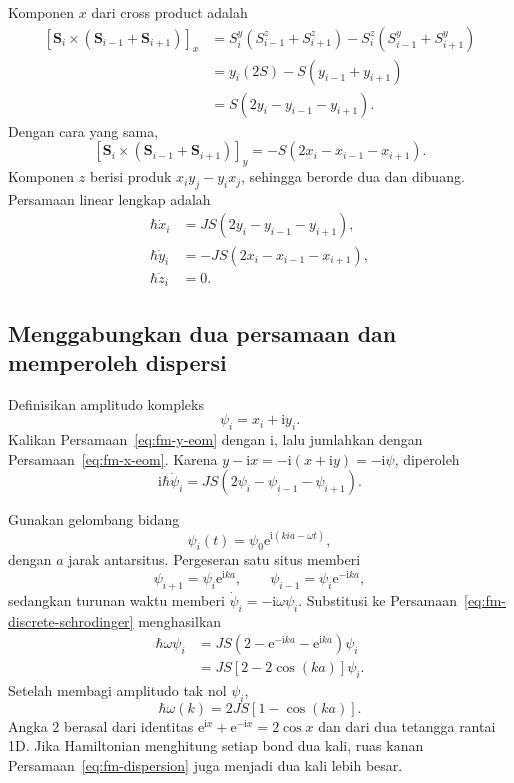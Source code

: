 \documentclass[11pt,a4paper]{article}
\newcommand{\ii}{\mathrm{i}}
\newcommand{\ee}{\mathrm{e}}
\newcommand{\vS}{\bm S}
\begin{document}
Komponen $x$ dari cross product adalah
\begin{align}
\left[\vS_i\times(\vS_{i-1}+\vS_{i+1})\right]_x
&=S_i^y(S_{i-1}^z+S_{i+1}^z)
-S_i^z(S_{i-1}^y+S_{i+1}^y)\\
&=y_i(2S)-S(y_{i-1}+y_{i+1})\\
&=S(2y_i-y_{i-1}-y_{i+1}).
\end{align}
Dengan cara yang sama,
\begin{equation}
\left[\vS_i\times(\vS_{i-1}+\vS_{i+1})\right]_y
=-S(2x_i-x_{i-1}-x_{i+1}).
\end{equation}
Komponen $z$ berisi produk $x_iy_j-y_ix_j$, sehingga berorde dua dan dibuang. Persamaan linear lengkap adalah
\begin{align}
\hbar\dot x_i&=JS(2y_i-y_{i-1}-y_{i+1}),\label{eq:fm-x-eom}\\
\hbar\dot y_i&=-JS(2x_i-x_{i-1}-x_{i+1}),\label{eq:fm-y-eom}\\
\hbar\dot z_i&=0.
\end{align}

\subsection{Menggabungkan dua persamaan dan memperoleh dispersi}

Definisikan amplitudo kompleks
\begin{equation}
\psi_i=x_i+\ii y_i.
\end{equation}
Kalikan Persamaan~\eqref{eq:fm-y-eom} dengan $\ii$, lalu jumlahkan dengan Persamaan~\eqref{eq:fm-x-eom}. Karena $y-\ii x=-\ii(x+\ii y)=-\ii\psi$, diperoleh
\begin{equation}
\ii\hbar\dot\psi_i
=JS(2\psi_i-\psi_{i-1}-\psi_{i+1}).
\label{eq:fm-discrete-schrodinger}
\end{equation}

Gunakan gelombang bidang
\begin{equation}
\psi_i(t)=\psi_0\ee^{\ii(kia-\omega t)},
\end{equation}
dengan $a$ jarak antarsitus. Pergeseran satu situs memberi
\begin{equation}
\psi_{i+1}=\psi_i\ee^{\ii ka},
\qquad
\psi_{i-1}=\psi_i\ee^{-\ii ka},
\end{equation}
sedangkan turunan waktu memberi $\dot\psi_i=-\ii\omega\psi_i$. Substitusi ke Persamaan~\eqref{eq:fm-discrete-schrodinger} menghasilkan
\begin{align}
\hbar\omega\psi_i
&=JS\left(2-\ee^{-\ii ka}-\ee^{\ii ka}\right)\psi_i\\
&=JS[2-2\cos(ka)]\psi_i.
\end{align}
Setelah membagi amplitudo tak nol $\psi_i$,
\begin{equation}
\boxed{\hbar\omega(k)=2JS[1-\cos(ka)].}
\label{eq:fm-dispersion}
\end{equation}
Angka $2$ berasal dari identitas $\ee^{\ii x}+\ee^{-\ii x}=2\cos x$ dan dari dua tetangga rantai 1D. Jika Hamiltonian menghitung setiap bond dua kali, ruas kanan Persamaan~\eqref{eq:fm-dispersion} juga menjadi dua kali lebih besar.
\end{document}
